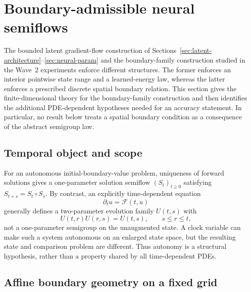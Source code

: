 \section{Boundary-admissible neural semiflows}\label{sec:boundary-semiflow}

The bounded latent gradient-flow construction of Sections~\ref{sec:latent-architecture}--\ref{sec:neural-param} and the boundary-family construction studied in the Wave~2 experiments enforce different structures.  The former enforces an interior pointwise state range and a learned-energy law, whereas the latter enforces a prescribed discrete spatial boundary relation.  This section gives the finite-dimensional theory for the boundary-family construction and then identifies the additional PDE-dependent hypotheses needed for an accuracy statement.  In particular, no result below treats a spatial boundary condition as a consequence of the abstract semigroup law.

\subsection{Temporal object and scope}

For an autonomous initial-boundary-value problem, uniqueness of forward solutions gives a one-parameter solution semiflow $(S_t)_{t\geq 0}$ satisfying $S_{t+s}=S_t\circ S_s$.  By contrast, an explicitly time-dependent equation
\begin{equation}\label{eq:nonautonomous-pde}
\partial_t u=\mathcal F(t,u)
\end{equation}
generally defines a two-parameter evolution family $U(t,s)$ with
\begin{equation}\label{eq:evolution-family-law}
U(t,r)U(r,s)=U(t,s),\qquad s\leq r\leq t,
\end{equation}
not a one-parameter semigroup on the unaugmented state.  A clock variable can make such a system autonomous on an enlarged state space, but the resulting state and comparison problem are different.  Thus autonomy is a structural hypothesis, rather than a property shared by all time-dependent PDEs.

\subsection{Affine boundary geometry on a fixed grid}

